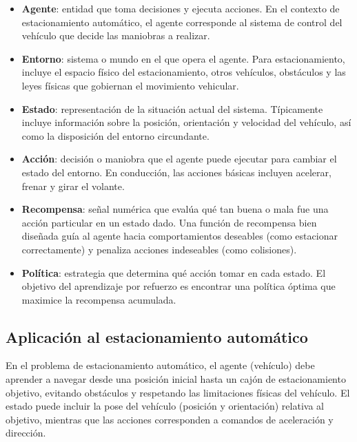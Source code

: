 \begin{itemize}
    \item \textbf{Agente}: entidad que toma decisiones y ejecuta acciones. En el contexto de estacionamiento automático,
    el agente corresponde al sistema de control del vehículo que decide las maniobras a realizar.
    
    \item \textbf{Entorno}: sistema o mundo en el que opera el agente. Para estacionamiento, incluye
    el espacio físico del estacionamiento, otros vehículos, obstáculos y las leyes físicas que gobiernan
    el movimiento vehicular.
    
    \item \textbf{Estado}: representación de la situación actual del sistema. Típicamente incluye
    información sobre la posición, orientación y velocidad del vehículo, así como la disposición
    del entorno circundante.
    
    \item \textbf{Acción}: decisión o maniobra que el agente puede ejecutar para cambiar el estado
    del entorno. En conducción, las acciones básicas incluyen acelerar, frenar y girar el volante.
    
    \item \textbf{Recompensa}: señal numérica que evalúa qué tan buena o mala fue una acción particular
    en un estado dado. Una función de recompensa bien diseñada guía al agente hacia comportamientos deseables
    (como estacionar correctamente) y penaliza acciones indeseables (como colisiones).
    
    \item \textbf{Política}: estrategia que determina qué acción tomar en cada estado. El objetivo
    del aprendizaje por refuerzo es encontrar una política óptima que maximice la recompensa acumulada.
\end{itemize}

\subsection{Aplicación al estacionamiento automático}\label{subsec:rl-parking}

En el problema de estacionamiento automático, el agente (vehículo) debe aprender a navegar desde
una posición inicial hasta un cajón de estacionamiento objetivo, evitando obstáculos y respetando
las limitaciones físicas del vehículo. El estado puede incluir la pose del vehículo (posición y orientación)
relativa al objetivo, mientras que las acciones corresponden a comandos de aceleración y dirección.


